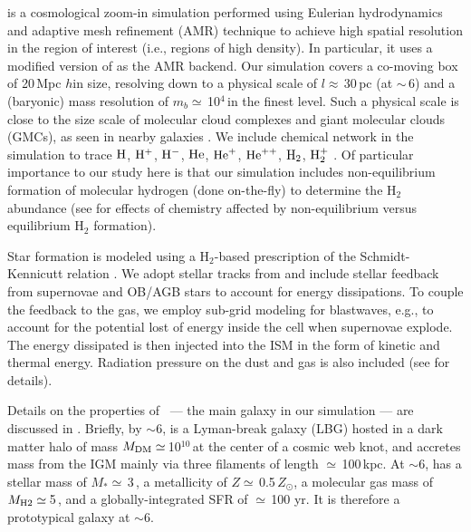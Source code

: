 \documentclass[iop]{emulateapj}
\begin{document}
 is a cosmological zoom-in simulation performed using Eulerian hydrodynamics and
adaptive mesh refinement (AMR) technique to achieve high spatial resolution in the region of interest (i.e., regions of high density).
In particular, it uses a modified version of  \citep{Teyssier2002a} as the AMR backend.
Our simulation covers a co-moving box of 20\,Mpc $h$\pmOne in size, resolving down to a physical scale of $l\approx$\,30\,pc (at \z$\sim$\,6) and a (baryonic) mass resolution of $m_b\simeq$\,10$^4$\,\Msun in the finest level. Such a physical scale is close to the size scale of molecular cloud complexes and giant molecular clouds (GMCs), as seen in nearby galaxies \citep[e.g.,][]{Sanders85a, Federrath13a, Goodman14a}.
We include chemical network in the simulation to trace $\rm{H}$, $\rm{H}^{+}$, $\rm{H}^{-}$, $\rm{He}$, $\rm{He}^{+}$, $\rm{He}^{++}$, $\rm{H}_2$, $\rm{H}_2^{+}$ \citep{Grassi14a,Bovino16a}.
Of particular importance to our study here is that our simulation includes non-equilibrium formation of molecular hydrogen (done on-the-fly) to determine the H$_2$ abundance (see \citealt{Pallottini17b} for effects of chemistry affected by non-equilibrium versus equilibrium H$_2$ formation).

Star formation is modeled using a H$_2$-based prescription of the Schmidt-Kennicutt relation \citep{Krumholz09a}. We adopt stellar tracks from  and include stellar feedback from supernovae and OB/AGB stars to account for energy dissipations. To couple the feedback to the gas, we employ sub-grid modeling for blastwaves, e.g., to account for the potential lost of energy inside the cell when supernovae explode. The energy dissipated is then injected into the ISM in the form of kinetic and thermal energy. Radiation pressure on the dust and gas is also included (see \citealt{Pallottini17a} for details).

Details on the properties of \flower\ --- the main galaxy in our simulation --- are discussed in \citet{Pallottini17b}.
Briefly, by \z$\sim$6, \flower is a Lyman-break galaxy (LBG) hosted in a dark matter halo of mass $M_{\rm DM}\simeq$\,10$^{10}$\,\Msun at the center of a cosmic web knot, and accretes mass from the IGM mainly via three filaments of length $\simeq$\,100\,kpc. At \z$\sim$6, \flower has a stellar mass of $M_*\simeq$\,3\,\Msun, a metallicity of $Z\simeq$\,0.5\,$Z_{\odot}$, a molecular gas mass of $M_{\rm H2}\simeq$\,5\,\Msun, and a globally-integrated SFR of $\simeq$\,100\,\Msun\,yr\pmOne. It is therefore a prototypical galaxy at \z$\sim$6.
\end{document}
